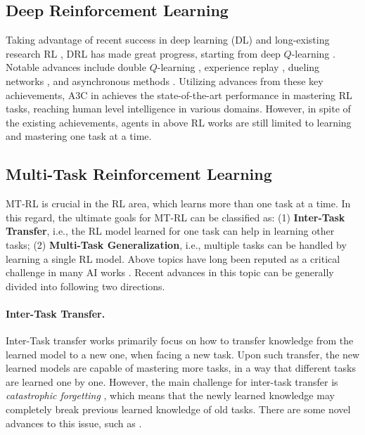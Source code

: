 \documentclass[letterpaper]{article} %
\begin{document}
\subsection{Deep Reinforcement Learning}
Taking advantage of recent success in deep learning (DL) \cite{lecun2015deep} and long-existing research RL \cite{sutton1998reinforcement}, DRL has made great progress, starting from deep $Q$-learning \cite{mnih2015human}. Notable advances include double $Q$-learning \cite{van2016deep}, experience replay \cite{schaul2015prioritized}, dueling networks \cite{wang2016dueling}, and asynchronous methods \cite{mnih2016asynchronous}. Utilizing advances from these key achievements, A3C in \cite{mnih2016asynchronous} achieves the state-of-the-art performance in mastering RL tasks, reaching human level intelligence in various domains. However, in spite of the existing achievements, agents in above RL works are still limited to learning and mastering one task at a time.

\subsection{Multi-Task Reinforcement Learning}
MT-RL is crucial in the RL area, which learns more than one task at a time. In this regard, the ultimate goals for MT-RL can be classified as:
(1) \textbf{Inter-Task Transfer}, i.e., the RL model learned for one task can help in learning other tasks;
(2) \textbf{Multi-Task Generalization}, i.e.,  multiple tasks can be handled by learning a single RL model.
Above topics have long been reputed as a critical challenge in many AI works \cite{ring1994continual, silver2013lifelong, taylor2011introduction}. Recent advances in this topic can be generally divided into following two directions.

\paragraph{Inter-Task Transfer.}
Inter-Task transfer works primarily focus on how to transfer knowledge from the learned model to a new one, when facing a new task.
Upon such transfer, the new learned models are capable of mastering more tasks, in a way that different tasks are learned one by one.
However, the main challenge for inter-task transfer is \textit{catastrophic forgetting} \cite{mccloskey1989catastrophic,mcclelland1995there,ratcliff1990connectionist}, which means that the newly learned knowledge may completely break previous learned knowledge of old tasks. There are some novel advances to this issue, such as \cite{rusu2016progressive,fahlman1990cascade,kirkpatrick2017overcoming,rusu2015policy,terekhov2015knowledge,parisotto16_actormimic}.
\end{document}

